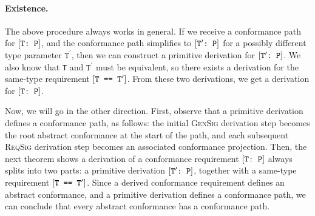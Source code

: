 \documentclass[../generics]{subfiles}
\begin{document}
\paragraph{Existence.} The above procedure always works in general. If we receive a conformance path for $[\texttt{T:~P}]$, and the conformance path simplifies to $[\texttt{$\texttt{T}^\prime$:~P}]$ for a possibly different type parameter $\texttt{T}^\prime$,
then we can construct a primitive derivation for $[\texttt{$\texttt{T}^\prime$:~P}]$. We also know that \texttt{T} and $\texttt{T}^\prime$ must be equivalent, so there exists a derivation for the same-type requirement $[\texttt{T == $\texttt{T}^\prime$}]$. From these two derivations, we get a derivation for $[\texttt{T:~P}]$.

Now, we will go in the other direction. First, observe that a primitive derivation defines a conformance path, as follows: the initial \textsc{GenSig} derivation step becomes the root abstract conformance at the start of the path, and each subsequent \textsc{ReqSig} derivation step becomes an associated conformance projection. Then, the next theorem shows a derivation of a conformance requirement $[\texttt{T:~P}]$ always splits into two parts: a primitive derivation $[\texttt{$\texttt{T}^\prime$:~P}]$, together with a same-type requirement $[\texttt{T == $\texttt{T}^\prime$}]$. Since a derived conformance requirement defines an abstract conformance, and a primitive derivation defines a conformance path, we can conclude that every abstract conformance has a conformance path. 
\end{document}
